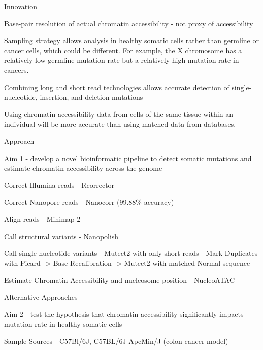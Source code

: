 \begin{outline}
\begin{outline}
\begin{outline}
		\end{outline}
	\end{outline}
	\item Innovation
	\begin{outline}
		\item Base-pair resolution of actual chromatin accessibility - not proxy of accessibility
		\item Sampling strategy allows analysis in healthy somatic cells rather than germline or cancer cells, which could be different. For example, the X chromosome has a relatively low germline mutation rate but a relatively high mutation rate in cancers. \parencite{makova_effects_2015}
		\item Combining long and short read technologies allows accurate detection of single-nucleotide, insertion, and deletion mutations
		\item Using chromatin accessibility data from cells of the same tissue within an individual will be more accurate than using matched data from databases.
	\end{outline}
	\item Approach
	\begin{outline}
		\item Aim 1 - develop a novel bioinformatic pipeline to detect somatic mutations and estimate chromatin accessibility across the genome
			\begin{outline}
				\item Correct Illumina reads - Rcorrector
				\item Correct Nanopore reads - Nanocorr (99.88\% accuracy) \parencite{goodwin_oxford_2015}
				\item Align reads - Minimap 2
				\item Call structural variants - Nanopolish
				\item Call single nucleotide variants - Mutect2 with only short reads - Mark Duplicates with Picard -> Base Recalibration -> Mutect2 with matched Normal sequence
				\item Estimate Chromatin Accessibility and nucleosome position - NucleoATAC \parencite{schep_structured_2015} 
				\item Alternative Approaches
			\end{outline}
		\item Aim 2 - test the hypothesis that chromatin accessibility significantly impacts mutation rate in healthy somatic cells
			\begin{outline}
				\item Sample Sources - C57Bl/6J, C57BL/6J-ApcMin/J (colon cancer model)

\end{outline}
\end{outline}
\end{outline}
